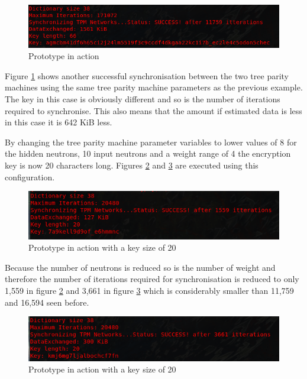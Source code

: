 \begin{figure}[!h]
  \centering
      \includegraphics[width=1\textwidth]{Figures/proto3.png}
  \caption[Prototype in action]{Prototype in action}
  \label{fig:prototype3}
\end{figure}

\FloatBarrier
Figure \ref{fig:prototype3} shows another successful synchronisation between the two tree parity machines using the same tree parity machine parameters as the previous example. The key in this case is obviously different and so is the number of iterations required to synchronise. This also means that the amount if estimated data is less in this case it is 642 KiB less.

By changing the tree parity machine parameter variables to lower values of 8 for the hidden neutrons, 10 input neutrons and a weight range of 4 the encryption key is now 20 characters long. Figures \ref{fig:prototype5} and \ref{fig:prototype6} are executed using this configuration.

\begin{figure}[!h]
  \centering
      \includegraphics[width=1\textwidth]{Figures/proto5.png}
  \caption[Prototype in action with a key size of 20]{Prototype in action with a key size of 20}
  \label{fig:prototype5}
\end{figure}
\FloatBarrier
Because the number of neutrons is reduced so is the number of weight and therefore the number of iterations required for synchronisation is reduced to only 1,559 in figure \ref{fig:prototype5} and 3,661 in figure \ref{fig:prototype6} which is considerably smaller than 11,759 and 16,594 seen before. 



\begin{figure}[!h]
  \centering
      \includegraphics[width=1\textwidth]{Figures/proto6.png}
  \caption[Prototype in action with a key size of 20]{Prototype in action with a key size of 20}
  \label{fig:prototype6}
\end{figure}
\FloatBarrier

